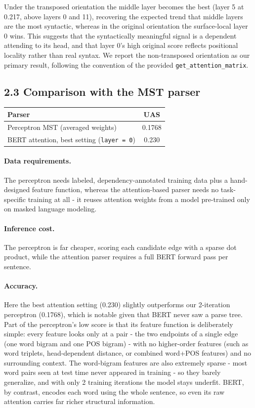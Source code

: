 \documentclass[11pt]{article}
\begin{document}
Under the transposed orientation the middle layer becomes the best (layer 5 at
0.217, above layers 0 and 11), recovering the expected trend that middle
layers are the most syntactic, whereas in the original orientation the
surface-local layer 0 wins. This suggests that the syntactically meaningful
signal is a dependent attending to its head, and that layer 0's high original
score reflects positional locality rather than real syntax. We report the
non-transposed orientation as our primary result, following the convention of
the provided \texttt{get\_attention\_matrix}.

\subsection*{2.3 \quad Comparison with the MST parser}

\begin{center}
\begin{tabular}{lc}
\toprule
Parser & UAS \\
\midrule
Perceptron MST (averaged weights)        & 0.1768 \\
BERT attention, best setting (\texttt{layer = 0}) & 0.230 \\
\bottomrule
\end{tabular}
\end{center}

\paragraph{Data requirements.}
The perceptron needs labeled, dependency-annotated training data plus a
hand-designed feature function, whereas the attention-based parser needs no
task-specific training at all - it reuses attention weights from a model
pre-trained only on masked language modeling.

\paragraph{Inference cost.}
The perceptron is far cheaper, scoring each candidate edge with a sparse dot
product, while the attention parser requires a full BERT forward pass per
sentence.

\paragraph{Accuracy.}
Here the best attention setting (0.230) slightly outperforms our 2-iteration
perceptron (0.1768), which is notable given that BERT never saw a parse tree.
Part of the perceptron's low score is that its feature function is
deliberately simple: every feature looks only at a pair - the two endpoints
of a single edge (one word bigram and one POS bigram) - with no higher-order
features (such as word triplets, head-dependent distance, or combined
word+POS features) and no surrounding context. The word-bigram features are
also extremely sparse - most word pairs seen at test time never appeared in
training - so they barely generalize, and with only 2 training iterations the
model stays underfit. BERT, by contrast, encodes each word using the whole
sentence, so even its raw attention carries far richer structural
information.
\end{document}
